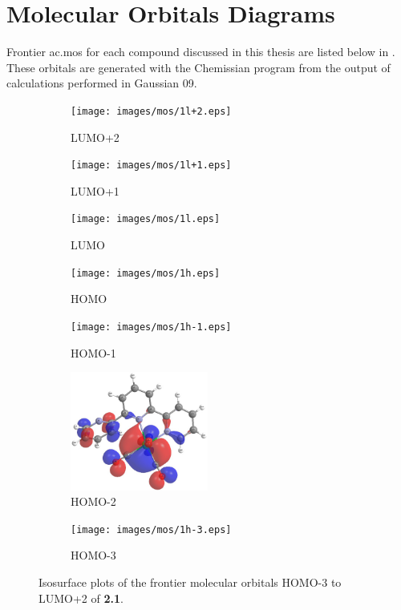 \chapter{Molecular Orbitals Diagrams} \label{app.mos}

Frontier \glspl{ac.mo} for each compound discussed in this thesis are listed below in . These orbitals are generated with the Chemissian program\autocite{chemissian} from the output of calculations performed in Gaussian 09\autocite{gaussian}.

\begin{figure}[!ht]
 \centering
 \begin{subfigure}[b]{0.31\textwidth}
  \texttt{[image: images/mos/1l+2.eps]}
  \caption{LUMO+2}
 \end{subfigure}
  \begin{subfigure}[b]{0.31\textwidth}
  \texttt{[image: images/mos/1l+1.eps]}
  \caption{LUMO+1}
 \end{subfigure}
  \begin{subfigure}[b]{0.31\textwidth}
  \texttt{[image: images/mos/1l.eps]}
  \caption{LUMO}
 \end{subfigure}
 \begin{subfigure}[b]{0.31\textwidth}
  \texttt{[image: images/mos/1h.eps]}
  \caption{HOMO}
 \end{subfigure}
 \begin{subfigure}[b]{0.31\textwidth}
  \texttt{[image: images/mos/1h-1.eps]}
  \caption{HOMO-1}
 \end{subfigure}
 \begin{subfigure}[b]{0.31\textwidth}
  \includegraphics[clip=true, width=\textwidth, height=39mm, keepaspectratio]{images/mos/1h-2.eps}
  \caption{HOMO-2}
 \end{subfigure}
 \begin{subfigure}[b]{0.31\textwidth}
  \texttt{[image: images/mos/1h-3.eps]}
  \caption{HOMO-3}
 \end{subfigure}
\caption[Molecular orbitals HOMO-3 to LUMO+2 of \textbf{2.1}.]{Isosurface plots of the frontier molecular orbitals HOMO-3 to LUMO+2 of \textbf{2.1}.}
\label{fig.mo21}
\end{figure} 

